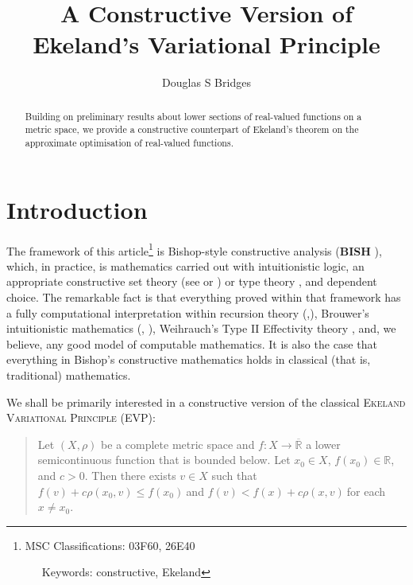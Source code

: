 \documentclass[11pt]{article}%
\begin{document}
\title{\textsf{A Constructive Version of Ekeland's Variational Principle}}
\author{\textsf{Douglas S Bridges}}
\maketitle

\begin{abstract}%
\noindent
\textsf{Building on preliminary results about lower sections of real-valued
functions on a metric space, we provide a constructive counterpart of
Ekeland's theorem on the approximate optimisation of real-valued functions.}

\end{abstract}

%

\normalfont\sf


\section{Introduction}

The framework of this article\footnote{%
\normalfont\sf
MSC Classifications: 03F60, 26E40
\par
\ \ \ Keywords: constructive, Ekeland} is Bishop-style constructive analysis
(\textbf{BISH} \cite{Bish, BB,Handbook}), which, in practice, is mathematics
carried out with intuitionistic logic, an appropriate constructive set theory
(see \cite[Ch. 2]{Handbook} or \cite{Aczel,dsbMorse}) or type theory
\cite{ML}, and dependent choice. The remarkable fact is that everything proved
within that framework has a fully computational interpretation within
recursion theory (\cite{Aberth, Kushner},\cite[Ch. 3]{BR}), Brouwer's
intuitionistic mathematics (\cite{Dummett,TvD}, \cite[Ch. 5]{BR}), Weihrauch's
Type II Effectivity theory \cite{Bauer,Wei}, and, we believe, any good model
of computable mathematics. It is also the case that everything in Bishop's
constructive mathematics holds in classical (that is, traditional) mathematics.

We shall be primarily interested in a constructive version of the classical
\textsc{Ekeland Variational Principle (EVP)}:

\begin{quote}
Let $\left(  X,\rho\right)  $ be a complete metric space and $f:X\rightarrow
\overline{\mathbb{R}}$ a lower semicontinuous function that is bounded below.
Let $x_{0}\in X$, $f(x_{0})\in\mathbb{R}$, and $c>0$. Then there exists $v\in
X$ such that $f(v)+c\rho(x_{0},v)\leqslant f(x_{0})\ $and $f(v)<f(x)+c\rho
(x,v)\ $for each $x\neq x_{0}$.
\end{quote}
\end{document}
